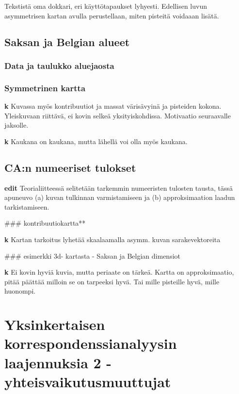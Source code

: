 \documentclass[
  finnish,
]{book}
\begin{document}
Tekstistä oma dokkari, eri käyttötapaukset lyhyesti. Edellisen luvun asymmetrisen
kartan avulla perustellaan, miten pisteitä voidaaan lisätä.

\hypertarget{saksan-ja-belgian-alueet}{%
\section{Saksan ja Belgian alueet}\label{saksan-ja-belgian-alueet}}

\hypertarget{data-ja-taulukko-aluejaosta}{%
\subsection{Data ja taulukko aluejaosta}\label{data-ja-taulukko-aluejaosta}}

\hypertarget{symmetrinen-kartta}{%
\subsection{Symmetrinen kartta}\label{symmetrinen-kartta}}

\textbf{k} Kuvassa myös kontribuutiot ja massat värisävyinä ja pisteiden kokona. Yleiskuvaan
riittävä, ei kovin selkeä yksityiskohdissa. Motivaatio seuraavalle jaksolle.

\textbf{k} Kaukana on kaukana, mutta lähellä voi olla myös kaukana.

\hypertarget{can-numeeriset-tulokset}{%
\section{CA:n numeeriset tulokset}\label{can-numeeriset-tulokset}}

\textbf{edit} Teorialiitteessä selitetään tarkemmin numeeristen tulosten tausta, tässä
apuneuvo (a) kuvan tulkinnan varmistamiseen ja (b) approksimaation laadun
tarkistamiseen.

\#\#\# kontribuutiokartta**

\textbf{k} Kartan tarkoitus lyhetää skaalaamalla asymm. kuvan sarakevektoreita

\#\#\# esimerkki 3d- kartasta - Saksan ja Belgian dimensiot

\textbf{k} Ei kovin hyviä kuvia, mutta periaate on tärkeä. Kartta on approksimaatio,
pitää päättää milloin se on tarpeeksi hyvä. Tai mille pisteille hyvä, mille huonompi.

\hypertarget{yksinkertaisen-korrespondenssianalyysin-laajennuksia-2---yhteisvaikutusmuuttujat}{%
\chapter{Yksinkertaisen korrespondenssianalyysin laajennuksia 2 - yhteisvaikutusmuuttujat}\label{yksinkertaisen-korrespondenssianalyysin-laajennuksia-2---yhteisvaikutusmuuttujat}}
\end{document}
